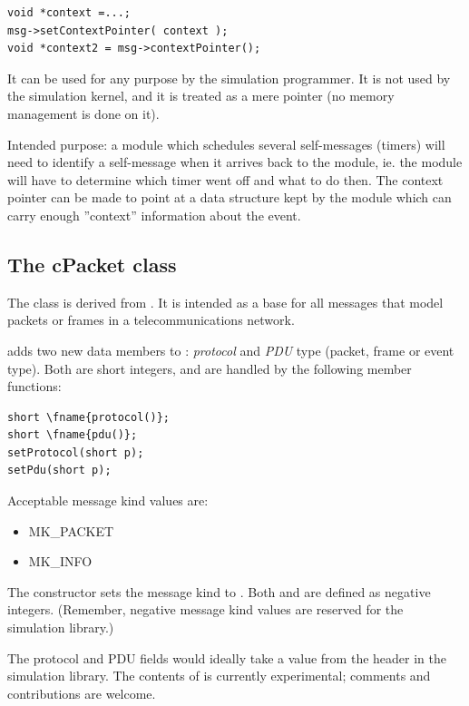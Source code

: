 \begin{verbatim}
void *context =...;
msg->setContextPointer( context );
void *context2 = msg->contextPointer();
\end{verbatim}


It can be used for any purpose by the simulation programmer.
It is not used by the simulation kernel, and it is treated as
a mere pointer (no memory management is done on it).

Intended purpose: a module which schedules several self-messages
(timers) will need to identify a self-message when it arrives back to
the module, ie. the module will have to determine which timer went off
and what to do then. The context pointer can be
made to point at a data structure kept by the module which can carry
enough ''context'' information about the event.





\subsection{The cPacket class}


The  class is derived from . It is intended as
a base for all messages that model packets or frames in a telecommunications
network.

 adds two new data members to :
\textit{protocol} and \textit{PDU} type (packet, frame or event type).
Both are short integers, and are handled by the following member
functions:

\begin{Verbatim}[commandchars=\\\{\}]
short \fname{protocol()};
short \fname{pdu()};
setProtocol(short p);
setPdu(short p);
\end{Verbatim}

Acceptable message kind values are:
\begin{itemize}
\item{MK\_PACKET}
\item{MK\_INFO}
\end{itemize}

The  constructor sets the message kind to .
Both  and  are defined as negative integers.
(Remember, negative message kind values are reserved for the simulation library.)

The protocol and PDU fields would ideally take a value from the 
header in the simulation library. The contents of 
is currently experimental; comments and contributions are welcome.



